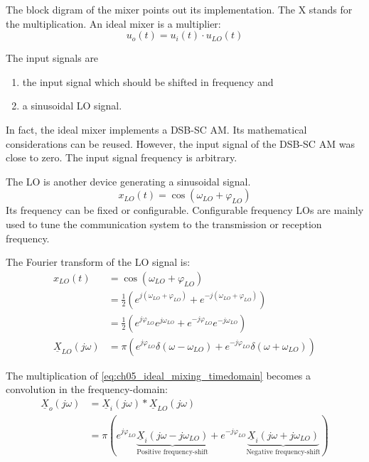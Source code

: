 \begin{refsection}
The block digram of the mixer points out its implementation. The X stands for the multiplication. An ideal mixer is a multiplier:
\begin{equation}
	u_o(t) = u_i(t) \cdot u_{LO}(t)
\end{equation}

The input signals are
\begin{enumerate}
	\item the input signal which should be shifted in frequency and
	\item a sinusoidal \acf{LO} signal.
\end{enumerate}

In fact, the ideal mixer implements a \ac{DSB-SC} \ac{AM}. Its mathematical considerations can be reused. However, the input signal of the \ac{DSB-SC} \ac{AM} was close to zero. The input signal frequency is arbitrary.

The \ac{LO} is another device generating a sinusoidal signal.
\begin{equation}
	x_{LO}(t) = \cos\left(\omega_{LO} + \varphi_{LO}\right)
	\label{eq:ch05_ideal_mixing_timedomain}
\end{equation}
Its frequency can be fixed or configurable. Configurable frequency \acp{LO} are mainly used to tune the communication system to the transmission or reception frequency.

The Fourier transform of the \ac{LO} signal is:
\begin{equation}
	\begin{split}
		x_{LO}(t) &= \cos\left(\omega_{LO} + \varphi_{LO}\right) \\
		 &= \frac{1}{2}\left(e^{j\left(\omega_{LO} + \varphi_{LO}\right)} + e^{-j\left(\omega_{LO} + \varphi_{LO}\right)}\right) \\
		 &= \frac{1}{2}\left(e^{j \varphi_{LO}} e^{j \omega_{LO}} + e^{-j \varphi_{LO}} e^{-j \omega_{LO}}\right) \\
		\underline{X}_{LO}\left(j\omega\right) &= \pi \left( e^{j \varphi_{LO}} \delta\left(\omega - \omega_{LO}\right) + e^{-j \varphi_{LO}} \delta\left(\omega + \omega_{LO}\right) \right)
	\end{split}
\end{equation}

The multiplication of \eqref{eq:ch05_ideal_mixing_timedomain} becomes a convolution in the frequency-domain:
\begin{equation}
	\begin{split}
		\underline{X}_{o}\left(j\omega\right) &= \underline{X}_{i}\left(j\omega\right) * \underline{X}_{LO}\left(j\omega\right) \\
		 &= \pi \left( e^{j \varphi_{LO}} \underbrace{\underline{X}_{i}\left(j\omega - j \omega_{LO}\right)}_{\text{Positive frequency-shift}} + e^{-j \varphi_{LO}} \underbrace{\underline{X}_{i}\left(j\omega + j \omega_{LO}\right)}_{\text{Negative frequency-shift}} \right)
	\end{split}
\end{equation}


\end{refsection}
